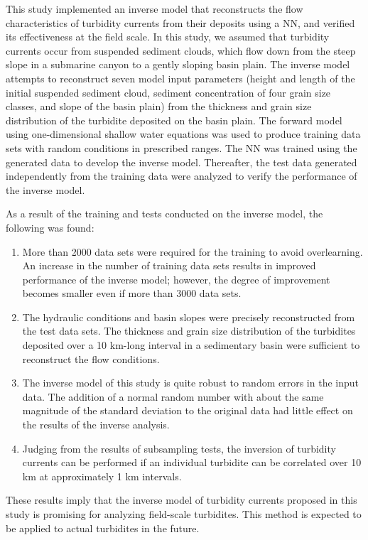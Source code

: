 
This study implemented an inverse model that reconstructs the flow characteristics of turbidity currents from their deposits using a NN, and verified its effectiveness at the field scale. In this study, we assumed that turbidity currents occur from suspended sediment clouds, which flow down from the steep slope in a submarine canyon to a gently sloping basin plain. The inverse model attempts to reconstruct seven model input parameters (height and length of the initial suspended sediment cloud, sediment concentration of four grain size classes, and slope of the basin plain) from the thickness and grain size distribution of the turbidite deposited on the basin plain. The forward model using one-dimensional shallow water equations was used to produce training data sets with random conditions in prescribed ranges. The NN was trained using the generated data to develop the inverse model. Thereafter, the test data generated independently from the training data were analyzed to verify the performance of the inverse model.

As a result of the training and tests conducted on the inverse model, the following was found:

\begin{enumerate}

\item More than 2000 data sets were required for the training to avoid overlearning. An increase in the number of training data sets results in improved performance of the inverse model; however, the degree of improvement becomes smaller even if more than 3000 data sets.

\item The hydraulic conditions and basin slopes were precisely reconstructed from the test data sets. The thickness and grain size distribution of the turbidites deposited over a 10 km-long interval in a sedimentary basin were sufficient to reconstruct the flow conditions.

\item The inverse model of this study is quite robust to random errors in the input data. The addition of a normal random number with about the same magnitude of the standard deviation to the original data had little effect on the results of the inverse analysis.

\item Judging from the results of subsampling tests, the inversion of turbidity currents can be performed if an individual turbidite can be correlated over 10 km at approximately 1 km intervals. 

\end{enumerate}

These results imply that the inverse model of turbidity currents proposed in this study is promising for analyzing field-scale turbidites. This method is expected to be applied to actual turbidites in the future.